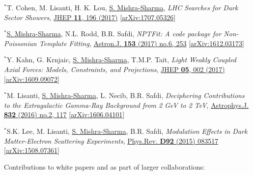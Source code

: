 \documentclass[letterpaper,11pt]{article}
\newenvironment{packed_enumerate}[1][]{
\begin{etaremune}[#1]
  \setlength{\itemsep}{3.7pt}
  \setlength{\parskip}{0pt}
  \setlength{\parsep}{0pt}}{\end{etaremune}
}
\begin{document}
\begin{packed_enumerate}[start=37]
  \item $^*$T. Cohen, M. Lisanti, H. K. Lou, \underline{S. Mishra-Sharma}, \emph{LHC Searches for Dark Sector Showers},  \href{https://link.springer.com/article/10.1007/JHEP11(2017)196}{JHEP \textbf{11}, 196 (2017)}  \href{https://arxiv.org/abs/1707.05326}{ [arXiv:1707.05326]}

  \item $^*$\underline{S. Mishra-Sharma}, N.L. Rodd, B.R. Safdi, \emph{NPTFit: A code package for Non-Poissonian Template Fitting},  \href{http://iopscience.iop.org/article/10.3847/1538-3881/aa6d5f/meta}{Astron.J. \textbf{153} (2017) no.6, 253}  \href{https://arxiv.org/abs/1612.03173}{ [arXiv:1612.03173]}

  \item $^*$Y. Kahn, G. Krnjaic, \underline{S. Mishra-Sharma}, T.M.P. Tait, \emph{Light Weakly Coupled Axial Forces: Models, Constraints, and Projections},  \href{https://link.springer.com/article/10.1007%2FJHEP05%282017%29002}{JHEP \textbf{05}, 002 (2017)}  \href{https://arxiv.org/abs/1609.09072}{[arXiv:1609.09072]}

  \item $^*$M. Lisanti, \underline{S. Mishra-Sharma}, L. Necib, B.R. Safdi, \emph{Deciphering Contributions to the Extragalactic Gamma-Ray Background from 2 GeV to 2 TeV},  \href{http://iopscience.iop.org/article/10.3847/0004-637X/832/2/117/meta}{Astrophys.J. \textbf{832} (2016) no.2, 117} \href{https://arxiv.org/abs/1606.04101}{[arXiv:1606.04101]}

  \item $^*$S.K. Lee, M. Lisanti, \underline{S. Mishra-Sharma}, B.R. Safdi, \emph{Modulation Effects in Dark Matter-Electron Scattering Experiments}, \href{https://journals.aps.org/prd/abstract/10.1103/PhysRevD.92.083517}{Phys.Rev. \textbf{D92} (2015) 083517} \href{https://arxiv.org/abs/1508.07361}{[arXiv:1508.07361]}
\end{packed_enumerate}

\noindent
Contributions to white papers and as part of larger collaborations:
\end{document}
